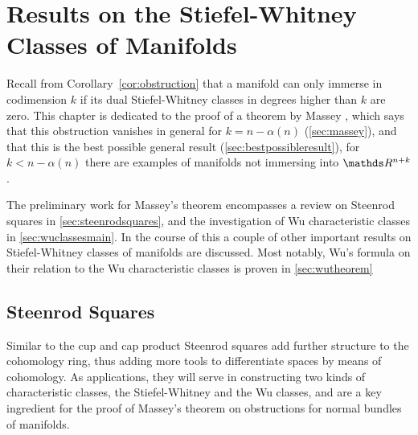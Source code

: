 % 

\chapter{Results on the Stiefel-Whitney Classes of Manifolds}
\label{chap:massey}
Recall from Corollary~\ref{cor:obstruction} that a manifold can
only immerse in codimension $k$ if its dual Stiefel-Whitney classes in
degrees higher than $k$ are zero.
This chapter is dedicated to the proof of a theorem by Massey
\cite{massey}, which says that this obstruction vanishes in general for
$k=n-\alpha(n)$ (\autoref{sec:massey}), and that this is the best
possible general result (\autoref{sec:bestpossibleresult}), \idest for
$k<n-\alpha(n)$ there are examples of manifolds not immersing into
$\R^{n+k}$.

The preliminary work for Massey's theorem encompasses a review on
Steenrod squares in \autoref{sec:steenrodsquares}, and the
investigation of Wu characteristic classes in
\autoref{sec:wuclassesmain}.
In the course of this a couple of other important results on
Stiefel-Whitney classes of manifolds are discussed.
Most notably, Wu's formula on their relation to the Wu
characteristic classes is proven in \autoref{sec:wutheorem}


\section{Steenrod Squares}\label{sec:steenrodsquares}
Similar to the cup and cap product Steenrod squares add further
structure to the cohomology ring, thus adding more tools to
differentiate spaces by means of cohomology.
As applications, they will serve in constructing two kinds of
characteristic classes, the Stiefel-Whitney and the Wu classes, and
are a key ingredient for the proof of Massey's theorem on obstructions
for normal bundles of manifolds.

